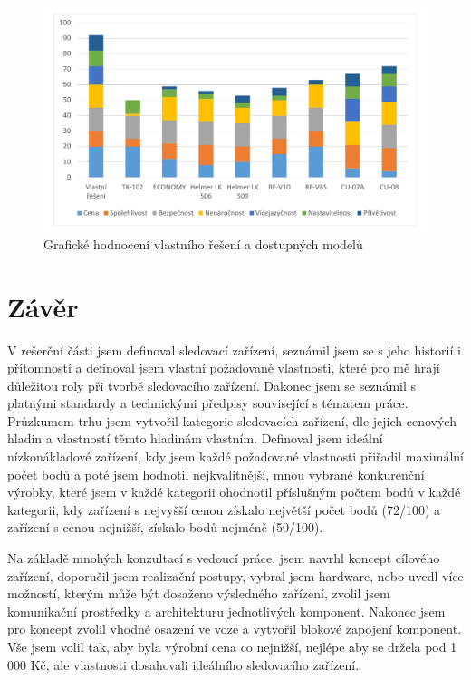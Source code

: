 \documentclass[FM,BP]{tulthesis}  %
\begin{document}
\begin{figure}[H]
\begin{center}
\includegraphics[width=\textwidth]{graphs/graf_bodoveHodnoceni_final.pdf}
\caption{Grafické hodnocení vlastního řešení a dostupných modelů}
\label{image}
\end{center}
\end{figure}


\chapter{Závěr}
V rešerční části jsem definoval sledovací zařízení, seznámil jsem se s jeho historií i přítomností a definoval jsem vlastní požadované vlastnosti, které pro mě hrají důležitou roly při tvorbě sledovacího zařízení. Dakonec jsem se seznámil s platnými standardy a technickými předpisy související s tématem práce. Průzkumem trhu jsem vytvořil kategorie sledovacích zařízení, dle jejich cenových hladin a vlastností těmto hladinám vlastním. Definoval jsem ideální nízkonákladové zařízení, kdy jsem každé požadované vlastnosti přiřadil maximální počet bodů a poté jsem hodnotil nejkvalitnější, mnou vybrané konkurenční výrobky, které jsem v každé kategorii ohodnotil příslušným počtem bodů v každé kategorii, kdy zařízení s nejvyšší cenou získalo největší počet bodů (72/100) a zařízení s cenou nejnižší, získalo bodů nejméně (50/100).

Na základě mnohých konzultací s vedoucí práce, jsem navrhl koncept cílového zařízení, doporučil jsem realizační postupy, vybral jsem hardware, nebo uvedl více možností, kterým může být dosaženo výsledného zařízení, zvolil jsem komunikační prostředky a architekturu jednotlivých komponent. Nakonec jsem pro koncept zvolil vhodné osazení ve voze a vytvořil blokové zapojení komponent. Vše jsem volil tak, aby byla výrobní cena co nejnižší, nejlépe aby se držela pod 1 000 Kč, ale vlastnosti dosahovali ideálního sledovacího zařízení.
\end{document}
